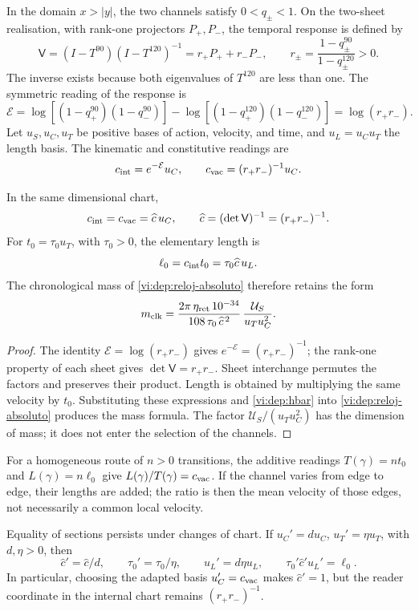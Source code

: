In the domain \(x>|y|\), the two channels satisfy \(0<q_\pm<1\).
On the two-sheet realisation, with rank-one projectors
\(P_+,P_-\), the temporal response is defined by
\[
 \mathsf V=(I-T^{90})(I-T^{120})^{-1}
          =r_+P_++r_-P_-,
 \qquad r_\pm=\frac{1-q_\pm^{90}}{1-q_\pm^{120}}>0.
\]
The inverse exists because both eigenvalues of \(T^{120}\) are less
than one. The symmetric reading of the response is
\[
 \mathcal E=
 \log[(1-q_+^{90})(1-q_-^{90})]
 -\log[(1-q_+^{120})(1-q_-^{120})]
 =\log(r_+r_-).
\]
Let \(u_S,u_C,u_T\) be positive bases of action, velocity, and
time, and \(u_L=u_Cu_T\) the length basis. The kinematic
and constitutive readings are
\[
 c_{\rm int}=e^{-\mathcal E}u_C,\qquad
 c_{\rm vac}=(r_+r_-)^{-1}u_C.
\]

\begin{proposition}
\label{vi:dep:velocidad-comun}
In the same dimensional chart,
\[
 c_{\rm int}=c_{\rm vac}=\widehat c\,u_C,
 \qquad \widehat c=(\det\mathsf V)^{-1}=(r_+r_-)^{-1}.
\]
For \(t_0=\tau_0u_T\), with \(\tau_0>0\), the elementary length is
\[
 \ell_0=c_{\rm int}t_0=\tau_0\widehat c\,u_L.
\]
The chronological mass of \eqref{vi:dep:reloj-absoluto} therefore
retains the form
\[
 m_{\rm clk}=
 \frac{2\pi\,\eta_{\rm ret}\,10^{-34}}
      {108\,\tau_0\,\widehat c^{\,2}}\,
 \frac{\mathcal U_S}{u_Tu_C^2}.
\]
\end{proposition}
\begin{proof}
The identity \(\mathcal E=\log(r_+r_-)\) gives
\(e^{-\mathcal E}=(r_+r_-)^{-1}\); the rank-one property of each sheet gives
\(\det\mathsf V=r_+r_-\). Sheet interchange permutes the
factors and preserves their product. Length is obtained by multiplying
the same velocity by \(t_0\). Substituting these expressions and
\eqref{vi:dep:hbar} into \eqref{vi:dep:reloj-absoluto} produces the
mass formula. The factor \(\mathcal U_S/(u_Tu_C^2)\) has
the dimension of mass; it does not enter the selection of the channels.
\end{proof}

For a homogeneous route of \(n>0\) transitions, the additive readings
\(T(\gamma)=nt_0\) and \(L(\gamma)=n\ell_0\) give
\(L(\gamma)/T(\gamma)=c_{\rm vac}\). If the channel varies from
edge to edge, their lengths are added; the ratio is then the mean
velocity of those edges, not necessarily a common local velocity.

Equality of sections persists under changes of chart. If
\(u_C'=du_C\), \(u_T'=\eta u_T\), with \(d,\eta>0\), then
\[
 \widehat c'=\widehat c/d,\qquad
 \tau_0'=\tau_0/\eta,\qquad u_L'=d\eta u_L,
 \qquad
 \tau_0'\widehat c'u_L'=\ell_0.
\]
In particular, choosing the adapted basis \(u_C'=c_{\rm vac}\)
makes \(\widehat c'=1\), but the reader coordinate in the
internal chart remains \((r_+r_-)^{-1}\).

